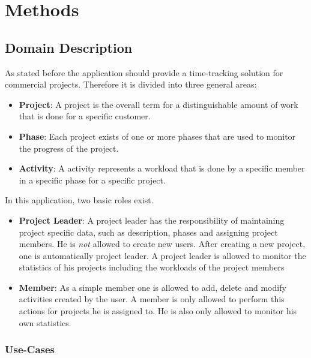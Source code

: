 \chapter{Methods}

\section{Domain Description}
As stated before the application should provide a time-tracking solution for commercial projects.
Therefore it is divided into three general areas:
\begin{itemize}
\item \textbf{Project}: A project is the overall term for a distinguishable amount of work that is done for a specific customer.
\item \textbf{Phase}: Each project exists of one or more phases that are used to monitor the progress of the project.
\item \textbf{Activity}: A activity represents a workload that is done by a specific member in a specific phase for a specific project.
\end{itemize}
In this application, two basic roles exist.
\begin{itemize}
\item \textbf{Project Leader}: A project leader has the responsibility of maintaining project specific data, such as description, phases and assigning project members. He is \emph{not} allowed to create new users. After creating a new project, one is automatically project leader. A project leader is allowed to monitor the statistics of his projects including the workloads of the project members
\item \textbf{Member}: As a simple member one is allowed to add, delete and modify activities created by the user. A member is only allowed to perform this actions for projects he is assigned to. He is also only allowed to monitor his own statistics.
\end{itemize}

\subsection{Use-Cases}

